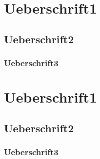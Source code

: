 \section{Ueberschrift1}								
\subsection{Ueberschrift2}								
\subsubsection{Ueberschrift3}

\section*{Ueberschrift1}								
\subsection*{Ueberschrift2}								
\subsubsection*{Ueberschrift3}						